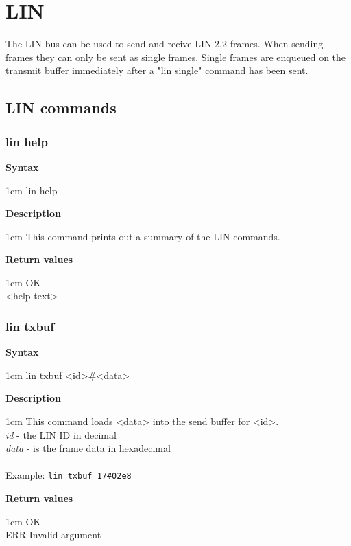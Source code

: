 \documentclass{article}[a4paper]
\begin{document}
\section{LIN}

The LIN bus can be used to send and recive LIN 2.2 frames.
When sending frames they can only be sent as single frames. Single frames are
enqueued on the transmit buffer immediately after a "lin single" command has been sent.


\subsection{LIN commands}
\subsubsection{lin help}
\begin{tcolorbox}
	{\bf Syntax}

	 1cm \dimexpr\linewidth-2cm\relax
	lin help

	\medskip
	{\bf Description}

	 1cm \dimexpr\linewidth-2cm\relax
	This command prints out a summary of the LIN commands.

	\medskip
	{\bf Return values}

	 1cm \dimexpr\linewidth-2cm\relax
	OK \\
	<help text>
\end{tcolorbox}

\subsubsection{lin txbuf}
\begin{tcolorbox}
	{\bf Syntax}

	 1cm \dimexpr\linewidth-2cm\relax
	lin txbuf <id>\#<data>

	\medskip
	{\bf Description}

	 1cm \dimexpr\linewidth-2cm\relax
	This command loads <data> into the send buffer for <id>.
	\medskip \\
	{\it id} - the LIN ID in decimal \\
	{\it data} - is the frame data in hexadecimal \\
	\medskip \\
	Example: \texttt{lin txbuf 17\#02e8}

	\medskip
	{\bf Return values}

	 1cm \dimexpr\linewidth-2cm\relax
	OK \\
	ERR Invalid argument
\end{tcolorbox}
\end{document}
